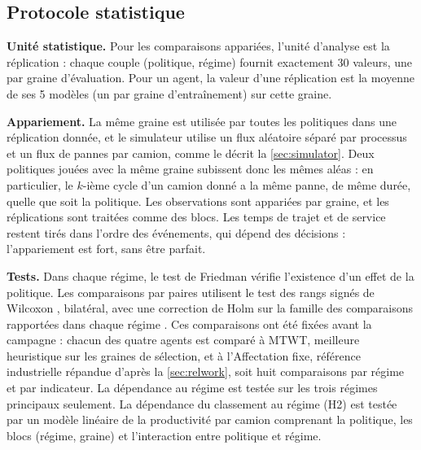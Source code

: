 \documentclass[11pt,a4paper]{article}
\newif\ifrevmarks
\newcommand{\revtag}[1]{\ifrevmarks\textsuperscript{\textcolor{red!70!black}{\scriptsize[#1]}}\fi}
\newcommand{\rev}[2]{\ifrevmarks{\color{revcolor}#2}\revtag{#1}\else#2\fi}
\newenvironment{revbloc}[1]{\par\ifrevmarks\color{revcolor}\noindent\revtag{#1}\ \fi}{\par}
\begin{document}
\subsection{Protocole statistique}
\label{sec:proto}

\begin{revbloc}{M3, M4, M5, M6, M7, M22, v3}
\textbf{Unité statistique.} Pour les comparaisons appariées, l'unité d'analyse est la réplication : chaque couple (politique, régime) fournit exactement 30 valeurs, une par graine d'évaluation. Pour un agent, la valeur d'une réplication est la moyenne de ses 5 modèles (un par graine d'entraînement) sur cette graine.

\textbf{Appariement.} La même graine est utilisée par toutes les politiques dans une réplication donnée, et le simulateur utilise un flux aléatoire séparé par processus et un flux de pannes par camion, comme le décrit la \cref{sec:simulator}. Deux politiques jouées avec la même graine subissent donc les mêmes aléas : en particulier, le $k$-ième cycle d'un camion donné a la même panne, de même durée, quelle que soit la politique. Les observations sont appariées par graine, et les réplications sont traitées comme des blocs. Les temps de trajet et de service restent tirés dans l'ordre des événements, qui dépend des décisions : l'appariement est fort, sans être parfait.

\textbf{Tests.} Dans chaque régime, le test de Friedman \cite{Friedman1937} vérifie l'existence d'un effet de la politique. Les comparaisons par paires utilisent le test des rangs signés de Wilcoxon \cite{Wilcoxon1945}, bilatéral, avec une correction de Holm \cite{Holm1979} sur la famille des comparaisons rapportées dans chaque régime \cite{Demsar2006}. \rev{v3}{Ces comparaisons ont été fixées avant la campagne : chacun des quatre agents est comparé à MTWT, meilleure heuristique sur les graines de sélection, et à l'Affectation fixe, référence industrielle répandue d'après la \cref{sec:relwork}, soit huit comparaisons par régime et par indicateur. La dépendance au régime est testée sur les trois régimes principaux seulement.} La dépendance du classement au régime (H2) est testée par un modèle linéaire de la productivité par camion comprenant la politique, les blocs (régime, graine) et l'interaction entre politique et régime.


\end{revbloc}
\end{document}
